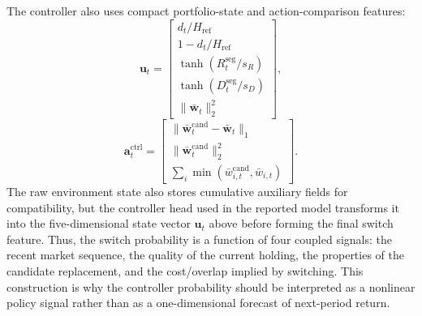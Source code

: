 \documentclass[letterpaper]{article} %
\begin{document}
The controller also uses compact portfolio-state and action-comparison features:
\[
\mathbf{u}_t=
\begin{bmatrix}
d_t/H_{\mathrm{ref}}\\
1-d_t/H_{\mathrm{ref}}\\
\tanh(R_t^{\mathrm{seg}}/s_R)\\
\tanh(D_t^{\mathrm{seg}}/s_D)\\
\|\bar{\mathbf{w}}_t\|_2^2
\end{bmatrix},
\]
\[
\mathbf{a}^{\mathrm{ctrl}}_t=
\begin{bmatrix}
\|\bar{\mathbf{w}}_t^{\mathrm{cand}}-\bar{\mathbf{w}}_t\|_1\\
\|\bar{\mathbf{w}}_t^{\mathrm{cand}}\|_2^2\\
\sum_i \min(\bar{w}_{i,t}^{\mathrm{cand}},\bar{w}_{i,t})
\end{bmatrix}.
\]
The raw environment state also stores cumulative auxiliary fields for compatibility, but the controller head used in the reported model transforms it into the five-dimensional state vector \(\mathbf{u}_t\) above before forming the final switch feature.
Thus, the switch probability is a function of four coupled signals: the recent market sequence, the quality of the current holding, the properties of the candidate replacement, and the cost/overlap implied by switching. This construction is why the controller probability should be interpreted as a nonlinear policy signal rather than as a one-dimensional forecast of next-period return.
\end{document}
